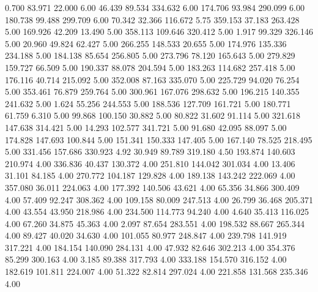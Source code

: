    0.700   83.971   22.000         6.00
  46.439   89.534  334.632         6.00
 174.706   93.984  290.099         6.00
 180.738   99.488  299.709         6.00
  70.342   32.366  116.672         5.75
 359.153   37.183  263.428         5.00
 169.926   42.209   13.490         5.00
 358.113  109.646  320.412         5.00
   1.917   99.329  326.146         5.00
  20.960   49.824   62.427         5.00
 266.255  148.533   20.655         5.00
 174.976  135.336  234.188         5.00
 184.138   85.654  256.805         5.00
 273.796   78.120  165.643         5.00
 279.829  159.727   66.509         5.00
 190.337   88.078  204.594         5.00
 183.263  114.682  257.418         5.00
 176.116   40.714  215.092         5.00
 352.008   87.163  335.070         5.00
 225.729   94.020   76.254         5.00
 353.461   76.879  259.764         5.00
 300.961  167.076  298.632         5.00
 196.215  140.355  241.632         5.00
   1.624   55.256  244.553         5.00
 188.536  127.709  161.721         5.00
 180.771   61.759    6.310         5.00
  99.868  100.150   30.882         5.00
  80.822   31.602   91.114         5.00
 321.618  147.638  314.421         5.00
  14.293  102.577  341.721         5.00
  91.680   42.095   88.097         5.00
 174.828  147.693  100.844         5.00
 151.341  150.333  147.405         5.00
 167.140   78.525  218.495         5.00
 331.456  157.686  330.923         4.92
  30.949   89.789  319.180         4.50
 193.874  140.603  210.974         4.00
 336.836   40.437  130.372         4.00
 251.810  144.042  301.034         4.00
  13.406   31.101   84.185         4.00
 270.772  104.187  129.828         4.00
 189.138  143.242  222.069         4.00
 357.080   36.011  224.063         4.00
 177.392  140.506   43.621         4.00
  65.356   34.866  300.409         4.00
  57.409   92.247  308.362         4.00
 109.158   80.009  247.513         4.00
  26.799   36.468  205.371         4.00
  43.554   43.950  218.986         4.00
 234.500  114.773   94.240         4.00
   4.640   35.413  116.025         4.00
  67.260   34.875   45.363         4.00
   2.097   87.654  283.551         4.00
 198.532   88.667  265.344         4.00
  89.427   40.020   34.630         4.00
 101.055   80.977  248.847         4.00
 239.798  141.919  317.221         4.00
 184.154  140.090  284.131         4.00
  47.932   82.646  302.213         4.00
 354.376   85.299  300.163         4.00
   3.185   89.388  317.793         4.00
 333.188  154.570  316.152         4.00
 182.619  101.811  224.007         4.00
  51.322   82.814  297.024         4.00
 221.858  131.568  235.346         4.00
